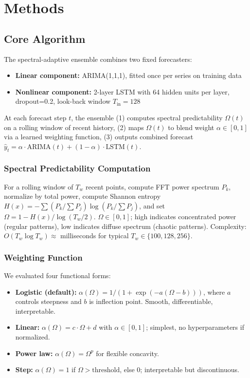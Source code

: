 \documentclass[11pt,letterpaper]{article}
\begin{document}
\section{Methods}

\subsection{Core Algorithm}

The spectral-adaptive ensemble combines two fixed forecasters:
\begin{itemize}
  \item \textbf{Linear component:} ARIMA(1,1,1), fitted once per series on training data
  \item \textbf{Nonlinear component:} 2-layer LSTM with 64 hidden units per layer, dropout=0.2, look-back window $T_{\text{in}}=128$
\end{itemize}

At each forecast step $t$, the ensemble (1) computes spectral predictability $\Omega(t)$ on a rolling window of recent history, (2) maps $\Omega(t)$ to blend weight $\alpha \in [0,1]$ via a learned weighting function, (3) outputs combined forecast $\hat{y}_t = \alpha \cdot \text{ARIMA}(t) + (1-\alpha) \cdot \text{LSTM}(t)$.

\subsubsection{Spectral Predictability Computation}

For a rolling window of $T_w$ recent points, compute FFT power spectrum $P_k$, normalize by total power, compute Shannon entropy $H(x) = -\sum (P_k / \sum P_j) \log(P_k / \sum P_j)$, and set $\Omega = 1 - H(x) / \log(T_w/2)$. $\Omega \in [0,1]$; high indicates concentrated power (regular patterns), low indicates diffuse spectrum (chaotic patterns). Complexity: $O(T_w \log T_w) \approx$ milliseconds for typical $T_w \in \{100, 128, 256\}$.

\subsubsection{Weighting Function}

We evaluated four functional forms:
\begin{itemize}
  \item \textbf{Logistic (default):} $\alpha(\Omega) = 1 / (1 + \exp(-a(\Omega - b)))$, where $a$ controls steepness and $b$ is inflection point. Smooth, differentiable, interpretable.
  \item \textbf{Linear:} $\alpha(\Omega) = c \cdot \Omega + d$ with $\alpha \in [0,1]$; simplest, no hyperparameters if normalized.
  \item \textbf{Power law:} $\alpha(\Omega) = \Omega^p$ for flexible concavity.
  \item \textbf{Step:} $\alpha(\Omega) = 1$ if $\Omega > \text{threshold}$, else 0; interpretable but discontinuous.
\end{itemize}
\end{document}
